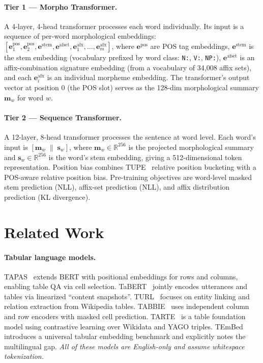 \documentclass[11pt]{article}
\begin{document}
\paragraph{Tier 1 — Morpho Transformer.}
A 4-layer, 4-head transformer processes each word individually.
Its input is a sequence of per-word morphological embeddings:
$[\mathbf{e}^{\text{pos}}_1, \mathbf{e}^{\text{pos}}_2, \mathbf{e}^{\text{stem}}, \mathbf{e}^{\text{afset}}, \mathbf{e}^{\text{afx}}_1, \dots, \mathbf{e}^{\text{afx}}_m]$,
where $\mathbf{e}^{\text{pos}}$ are POS tag embeddings, $\mathbf{e}^{\text{stem}}$ is the stem embedding (vocabulary prefixed by word class: \texttt{N:}, \texttt{V:}, \texttt{NP:}), $\mathbf{e}^{\text{afset}}$ is an affix-combination signature embedding (from a vocabulary of 34,008 affix sets), and each $\mathbf{e}^{\text{afx}}_i$ is an individual morpheme embedding.
The transformer's output vector at position 0 (the POS slot) serves as the 128-dim morphological summary $\mathbf{m}_w$ for word $w$.

\paragraph{Tier 2 — Sequence Transformer.}
A 12-layer, 8-head transformer processes the sentence at word level.
Each word's input is $[\mathbf{m}_w \;\|\; \mathbf{s}_w]$, where $\mathbf{m}_w \in \mathbb{R}^{256}$ is the projected morphological summary and $\mathbf{s}_w \in \mathbb{R}^{256}$ is the word's stem embedding, giving a 512-dimensional token representation.
Position bias combines TUPE~\citep{ke-etal-2021-rethinking} relative position bucketing with a POS-aware relative position bias.
Pre-training objectives are word-level masked stem prediction (NLL), affix-set prediction (NLL), and affix distribution prediction (KL divergence).

\section{Related Work}
\label{sec:related}

\paragraph{Tabular language models.}
TAPAS~\citep{herzig-etal-2020-tapas} extends BERT with positional embeddings for rows and columns, enabling table QA via cell selection.
TaBERT~\citep{yin-etal-2020-tabert} jointly encodes utterances and tables via linearized ``content snapshots''.
TURL~\citep{deng-etal-2022-turl} focuses on entity linking and relation extraction from Wikipedia tables.
TABBIE~\citep{iida-etal-2021-tabbie} uses independent column and row encoders with masked cell prediction.
TARTE~\citep{zhang-etal-2025-tarte} is a table foundation model using contrastive learning over Wikidata and YAGO triples.
TEmBed~\citep{burak-etal-2026-tembed} introduces a universal tabular embedding benchmark and explicitly notes the multilingual gap.
\emph{All of these models are English-only and assume whitespace tokenization.}
\end{document}
